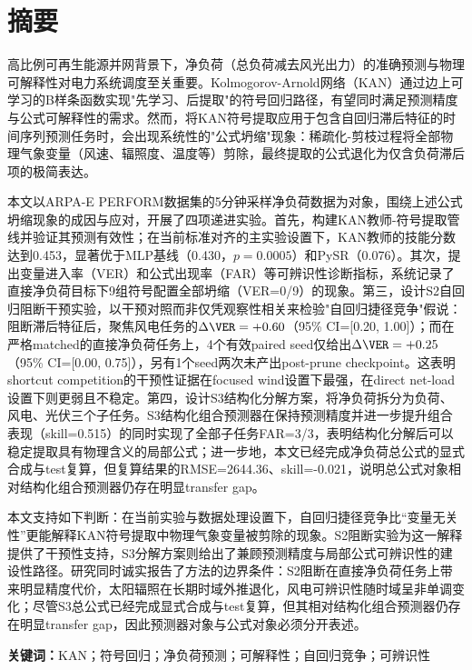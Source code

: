 \chapter*{摘\quad 要}

高比例可再生能源并网背景下，净负荷（总负荷减去风光出力）的准确预测与物理可解释性对电力系统调度至关重要。Kolmogorov-Arnold网络（KAN）通过边上可学习的B样条函数实现"先学习、后提取"的符号回归路径，有望同时满足预测精度与公式可解释性的需求。然而，将KAN符号提取应用于包含自回归滞后特征的时间序列预测任务时，会出现系统性的"公式坍缩"现象：稀疏化-剪枝过程将全部物理气象变量（风速、辐照度、温度等）剪除，最终提取的公式退化为仅含负荷滞后项的极简表达。

本文以ARPA-E PERFORM数据集的5分钟采样净负荷数据为对象，围绕上述公式坍缩现象的成因与应对，开展了四项递进实验。首先，构建KAN教师-符号提取管线并验证其预测有效性；在当前标准对齐的主实验设置下，KAN教师的技能分数达到0.453，显著优于MLP基线（0.430，$p=0.0005$）和PySR（0.076）。其次，提出变量进入率（VER）和公式出现率（FAR）等可辨识性诊断指标，系统记录了直接净负荷目标下9组符号配置全部坍缩（VER=0/9）的现象。第三，设计S2自回归阻断干预实验，以干预对照而非仅凭观察性相关来检验"自回归捷径竞争"假说：阻断滞后特征后，聚焦风电任务的$\Delta\VER=+0.60$（95\% CI=[0.20, 1.00]）；而在严格matched的直接净负荷任务上，4个有效paired seed仅给出$\Delta\VER=+0.25$（95\% CI=[0.00, 0.75]），另有1个seed两次未产出post-prune checkpoint。这表明shortcut competition的干预性证据在focused wind设置下最强，在direct net-load设置下则更弱且不稳定。第四，设计S3结构化分解方案，将净负荷拆分为负荷、风电、光伏三个子任务。S3结构化组合预测器在保持预测精度并进一步提升组合表现（skill=0.515）的同时实现了全部子任务FAR=3/3，表明结构化分解后可以稳定提取具有物理含义的局部公式；进一步地，本文已经完成净负荷总公式的显式合成与test复算，但复算结果的RMSE=2644.36、skill=-0.021，说明总公式对象相对结构化组合预测器仍存在明显transfer gap。

本文支持如下判断：在当前实验与数据处理设置下，自回归捷径竞争比“变量无关性”更能解释KAN符号提取中物理气象变量被剪除的现象。S2阻断实验为这一解释提供了干预性支持，S3分解方案则给出了兼顾预测精度与局部公式可辨识性的建设性路径。研究同时诚实报告了方法的边界条件：S2阻断在直接净负荷任务上带来明显精度代价，太阳辐照在长期时域外推退化，风电可辨识性随时域呈非单调变化；尽管S3总公式已经完成显式合成与test复算，但其相对结构化组合预测器仍存在明显transfer gap，因此预测器对象与公式对象必须分开表述。

\vspace{1em}
\noindent\textbf{关键词：}KAN；符号回归；净负荷预测；可解释性；自回归竞争；可辨识性

